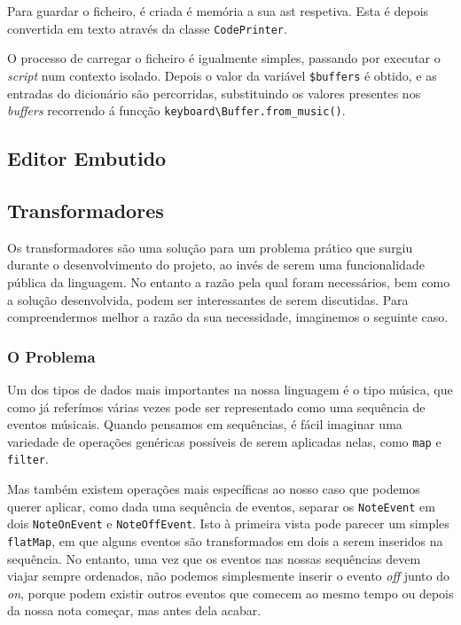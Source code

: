 Para guardar o ficheiro, é criada é memória a sua \acrshort{ast} respetiva. Esta é depois convertida em texto através da classe \texttt{CodePrinter}.

O processo de carregar o ficheiro é igualmente simples, passando por executar o \textit{script} num contexto isolado. Depois o valor da variável \texttt{\$buffers} é obtido, e as entradas do dicionário são percorridas, substituindo os valores presentes nos \textit{buffers} recorrendo á funcção \texttt{keyboard\textbackslash{}Buffer.from\_music()}.

\subsection{Editor Embutido}
\subsection{Transformadores}
Os transformadores são uma solução para um problema prático que surgiu durante o desenvolvimento do projeto, ao invés de serem uma funcionalidade pública da linguagem. No entanto a razão pela qual foram necessários, bem como a solução desenvolvida, podem ser interessantes de serem discutidas. Para compreendermos melhor a razão da sua necessidade, imaginemos o seguinte caso.

\subsubsection{O Problema}

Um dos tipos de dados mais importantes na nossa linguagem é o tipo música, que como já referímos várias vezes pode ser representado como uma sequência de eventos músicais. Quando pensamos em sequências, é fácil imaginar uma variedade de operações genéricas possíveis de serem aplicadas nelas, como \texttt{map} e \texttt{filter}. 

Mas também existem operações mais específicas ao nosso caso que podemos querer aplicar, como dada uma sequência de eventos, separar os \texttt{NoteEvent} em dois \texttt{NoteOnEvent} e \texttt{NoteOffEvent}. Isto à primeira vista pode parecer um simples \texttt{flatMap}, em que alguns eventos são transformados em dois a serem inseridos na sequência. No entanto, uma vez que os eventos nas nossas sequências devem viajar sempre ordenados, não podemos simplesmente inserir o evento \textit{off} junto do \textit{on}, porque podem existir outros eventos que comecem ao mesmo tempo ou depois da nossa nota começar, mas antes dela acabar.

